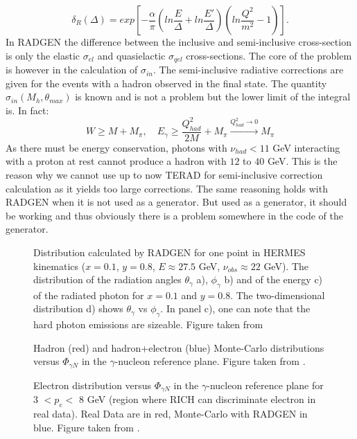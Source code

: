 %
\begin{equation}
  \delta_R(\Delta) = exp \left[-\frac{\alpha}{\pi}\left(ln \frac{E}{\Delta}+ln \frac{E'}{\Delta}\right)\left(ln \frac{Q^2}{m^2}-1\right)\right].
\end{equation}
%
In RADGEN the difference between the inclusive and semi-inclusive cross-section is only the elastic $\sigma_{el}$ and quasielactic $\sigma_{qel}$ cross-sections. The core of the problem is however in the calculation of $\sigma_{in}$. The semi-inclusive radiative corrections are given for the events with a hadron observed in the final state. The quantity $\sigma_{in}(M_{h},\theta_{max})$ is known and is not a problem but the lower limit of the integral is. In fact:
%
\begin{equation}
    W \geqslant M + M_{\pi},\quad E_{\gamma} \geqslant \frac{Q^2_{had}}{2M}+M_{\pi} \xrightarrow{Q^2_{had} \rightarrow 0} M_{\pi}
\end{equation}
%
As there must be energy conservation, photons with $\nu_{had} < 11$ GeV interacting with a proton at rest cannot produce a hadron with $12$ to $40$ GeV. This is the reason why we cannot use up to now TERAD for semi-inclusive correction calculation as it yields too large corrections. The same reasoning holds with RADGEN when it is not used as a generator. But used as a generator, it should be working and thus obviously there is a problem somewhere in the code of the generator.
%
\begin{figure}[htb]
\centerline{}
\caption{Distribution calculated by RADGEN for one point in HERMES kinematics ($x=0.1$, $y=0.8$, $E\approx27.5$ GeV, $\nu_{obs}\approx22$ GeV). The distribution of the radiation angles $\theta_{\gamma}$ a), $\phi_{\gamma}$ b) and of the energy c) of the radiated photon for $x=0.1$ and $y=0.8$. The two-dimensional distribution d) shows $\theta_{\gamma}$ vs $\phi_{\gamma}$. In panel c), one can note that the hard photon emissions are sizeable. Figure taken from \cite{RADGEN}}\label{fig:RAD}
\end{figure}

\begin{figure}[htb!]
\centerline{}
\caption{Hadron (red) and hadron+electron (blue) Monte-Carlo distributions versus $\Phi_{\gamma N}$ in the $\gamma$-nucleon reference plane. Figure taken from \cite{MarcinTalk}.}\label{fig:elprod}
\end{figure}

\begin{figure}[htb!]
\centerline{}
\caption{Electron distribution versus $\Phi_{\gamma N}$ in the $\gamma$-nucleon reference plane for 3 $< p_e <$ 8 GeV (region where RICH can discriminate electron in real data). Real Data are in red, Monte-Carlo with RADGEN in blue. Figure taken from \cite{MarcinTalk}.}\label{fig:ph_pl}
\end{figure}

